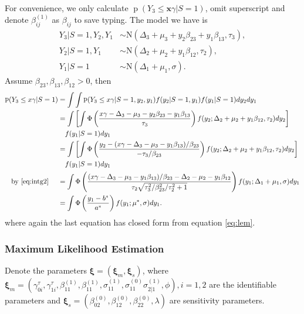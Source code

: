 \documentclass[12pt]{article}
\DeclareMathOperator{\pr}{p}
\begin{document}
\begin{enumerate}
  For convenience, we only calculate $\pr (Y_3 \leq \bm x\gamma | S=
  1)$, omit superscript and denote $\beta_{ij}^{(1)} $ as $\beta_{ij}$
  to save typing.  The model we have is
  \begin{align*}
    Y_3 | S= 1 , Y_2, Y_1 & \sim \textrm{N}(\Delta_3 + \mu_3 + y_2\beta_{23} + y_1\beta_{13}, \tau_3), \\
    Y_2 | S = 1, Y_{1}  & \sim \textrm{N}(\Delta_2 + \mu_2 + y_1\beta_{12}, \tau_2) ,               \\
    Y_1 | S= 1 & \sim \textrm{N}(\Delta_1 + \mu_1, \sigma).
  \end{align*}
  Assume $\beta_{23}, \beta_{13}, \beta_{12} > 0 $, then
  \begin{align*}
    \pr (Y_3 \leq x\gamma |S = 1) & = \int \int \pr (Y_3 \leq x\gamma|S = 1, y_2, y_1) f(y_2|S=1, y_1) f(y_1|S=1) dy_2dy_1\\
    & = \int \left[ \int \Phi \left( \frac{x\gamma - \Delta_3 - \mu_3 - y_2\beta_{23}- y_1\beta_{13}}{\tau_3} \right) f(y_2; \Delta_2+\mu_2+y_1\beta_{12}, \tau_2)dy_2 \right]\\
    & \quad f(y_1|S=1) dy_1\\
    & = \int \left[ \int \Phi \left( \frac{y_2 - (x\gamma - \Delta_3 - \mu_3 - y_1\beta_{13})/\beta_{23}}{-\tau_3/\beta_{23}} \right) f(y_2; \Delta_2+\mu_2+y_1\beta_{12}, \tau_2)dy_2 \right] \\
    & \quad f(y_1|S=1) dy_1\\
    \text{by \eqref{eq:intg2} } \quad & = \int \Phi \left( \frac{(x\gamma - \Delta_3 - \mu_3 - y_1\beta_{13})/\beta_{23} - \Delta_2 - \mu_2 - y_1\beta_{12}}{\tau_2 \sqrt{\tau_3^2/\beta_{23}^2/\tau_2^2 + 1}} \right)f(y_1; \Delta_1+ \mu_1, \sigma) dy_1\\
    & = \int \Phi \left( \frac{y_1 - b^{*}}{a^{*}} \right) f(y_1;
    \mu^{*}, \sigma) dy_1.
  \end{align*}
  where again the last equation has closed form from equation
  \eqref{eq:lem}.
\end{enumerate}


\subsubsection{Maximum Likelihood Estimation}
\label{sec:mle}
Denote the parameters $\bm \xi = (\bm \xi_m, \bm \xi_s)$, where $\bm
\xi_m = ( \gamma_{0i}^{\tau}, \gamma_{1i}^{\tau}, \beta_{11}^{(1)},
\beta_{11}^{(1)}, \sigma_{11}^{(1)},\sigma_{11}^{(0)}
\sigma_{2|1}^{(1)}, \phi) , i= 1, 2 $ are the identifiable parameters
and $\bm \xi_s = (\beta_{02}^{(0)}, \beta_{12}^{(0)},
\beta_{22}^{(0)}, \lambda)$ are sensitivity parameters.
\end{document}
